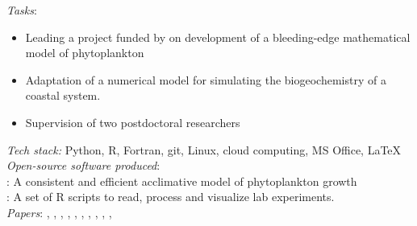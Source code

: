 \documentclass[
	a4paper,
]{fortysecondscv}
\begin{document}
\begin{cvtable}[1.0]
	{\href{https://uol.de/en/icbm}{\color{pblue}{Uni. Oldenburg, Germany}}}
	{\textit{Tasks}:
	\begin{itemize}[topsep=0pt,itemsep=0pt,partopsep=0pt, parsep=0pt, leftmargin=*]
     \item Leading a project funded by \href{https://www.dfg.de/en}{\color{pblue}{DFG}} on development of a bleeding-edge mathematical model of phytoplankton %
     \item Adaptation of a numerical model for simulating the biogeochemistry of a coastal system.
     \item Supervision of two postdoctoral researchers
    \end{itemize}
      \textit{Tech stack:} Python, R, Fortran, git, Linux, cloud computing, MS Office, \LaTeX\\  
      \textit{Open-source software produced}:\\
      \href{https://github.com/OnurKerimoglu/fabm-nflexpd}{\color{pblue}{FABM-NflexPD}}: A consistent and efficient acclimative model of phytoplankton growth\\
      \href{https://github.com/OnurKerimoglu/R-EcoMol}{\color{pblue}{R-EcoMol}}: A set of R scripts to read, process and visualize lab experiments.\\
      \textit{Papers}:
      \href{https://doi.org/10.1016/j.ecolmodel.2020.109401}{\color{pblue}{1}}, %
      \href{https://doi.org/10.1111/ele.13680}{\color{pblue}{2}},  %
      \href{https://doi.org/10.5194/gmd-14-6025-2021}{\color{pblue}{3}}, %
      \href{https://doi.org/10.3389/fmars.2021.675428}{\color{pblue}{4}}, %
      \href{https://doi.org/10.1002/lno.12005}{\color{pblue}{5}}, %
      \href{https://doi.org/10.3389/fmars.2022.975414}{\color{pblue}{6}}, %
      \href{https://doi.org/10.1101/2022.05.18.492269}{\color{pblue}{7}}, %
      \href{https://doi.org/10.1016/j.scitotenv.2022.158757}{\color{pblue}{8}}, %
      \href{https://doi.org/10.5194/gmd-16-95-2023}{\color{pblue}{9}}, %
      \href{https://doi.org/10.3389/fmars.2022.963325}{\color{pblue}{10}}, %
      \href{https://doi.org/10.3389/fmars.2023.1129951}{\color{pblue}{11}} %
    }
    
\end{cvtable}
\end{document}
